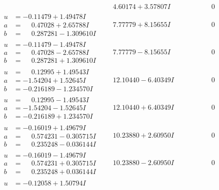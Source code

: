 \documentclass[1p]{elsarticle_modified}
\theoremstyle{definition}
\begin{document}
$$\begin{array}{c|c|c}
 & \phantom{-}4.60174 + 3.57807 I & \phantom{-0.000000 } 0 \\ \hline\begin{aligned}
u &= -0.11479 + 1.49478 I \\
a &= \phantom{-}0.47028 + 2.65788 I \\
b &= \phantom{-}0.287281 - 1.309610 I\end{aligned}
 & \phantom{-}7.77779 + 8.15655 I & \phantom{-0.000000 } 0 \\ \hline\begin{aligned}
u &= -0.11479 - 1.49478 I \\
a &= \phantom{-}0.47028 - 2.65788 I \\
b &= \phantom{-}0.287281 + 1.309610 I\end{aligned}
 & \phantom{-}7.77779 - 8.15655 I & \phantom{-0.000000 } 0 \\ \hline\begin{aligned}
u &= \phantom{-}0.12995 + 1.49543 I \\
a &= -1.54204 + 1.52645 I \\
b &= -0.216189 - 1.234570 I\end{aligned}
 & \phantom{-}12.10440 - 6.40349 I & \phantom{-0.000000 } 0 \\ \hline\begin{aligned}
u &= \phantom{-}0.12995 - 1.49543 I \\
a &= -1.54204 - 1.52645 I \\
b &= -0.216189 + 1.234570 I\end{aligned}
 & \phantom{-}12.10440 + 6.40349 I & \phantom{-0.000000 } 0 \\ \hline\begin{aligned}
u &= -0.16019 + 1.49679 I \\
a &= \phantom{-}0.574231 - 0.305715 I \\
b &= \phantom{-}0.235248 - 0.036144 I\end{aligned}
 & \phantom{-}10.23880 + 2.60950 I & \phantom{-0.000000 } 0 \\ \hline\begin{aligned}
u &= -0.16019 - 1.49679 I \\
a &= \phantom{-}0.574231 + 0.305715 I \\
b &= \phantom{-}0.235248 + 0.036144 I\end{aligned}
 & \phantom{-}10.23880 - 2.60950 I & \phantom{-0.000000 } 0 \\ \hline\begin{aligned}
u &= -0.12058 + 1.50794 I \\

\end{aligned}
\end{array}$$
\end{document}
